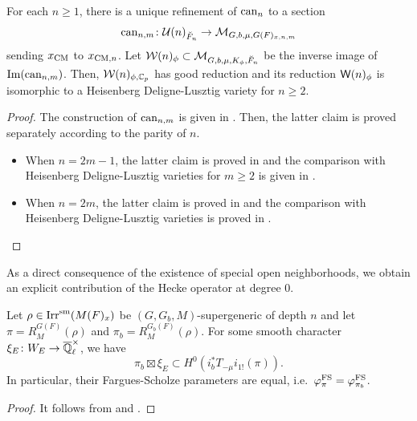 \documentclass[12pt,reqno]{amsart}
\begin{document}
\begin{thm} \label{thm:property_of_special_affinoids}
    For each $n \geq 1$, there is a unique refinement of ${\operatorname{can}}_n$ to a section
    \[
        {\operatorname{can}}_{n, m} \colon {\mathcal{U}}(n)_{\breve{F}_n} \to {\mathcal{M}}_{G, b, \mu, G(F)_{x, n, m}}
    \]
    sending $x_{\operatorname{CM}}$ to $x_{{\operatorname{CM}}, n}$. Let ${\mathcal{W}}(n)_\phi \subset {\mathcal{M}}_{G, b, \mu, K_\phi, \breve{F}_n}$ be the inverse image of ${\operatorname{Im}}({\operatorname{can}}_{n, m})$. Then, ${\mathcal{W}}(n)_{\phi, \mathbb{C}_p}$ has good reduction and its reduction ${\mathsf{W}}(n)_\phi$ is isomorphic to a Heisenberg Deligne-Lusztig variety for $n \geq 2$. 
\end{thm}
\begin{proof}
    The construction of ${\operatorname{can}}_{n, m}$ is given in . Then, the latter claim is proved separately according to the parity of $n$. 
    \begin{itemize}
        \item When $n = 2m - 1$, the latter claim is proved in  and the comparison with Heisenberg Deligne-Lusztig varieties for $m \geq 2$ is given in . 
        \item When $n = 2m$, the latter claim is proved in  and the comparison with Heisenberg Deligne-Lusztig varieties is proved in . 
    \end{itemize}
    \vspace{-\topsep}
\end{proof}

As a direct consequence of the existence of special open neighborhoods, we obtain an explicit contribution of the Hecke operator at degree $0$. 

\begin{cor} \label{cor:Hecke_operator_unramified_CM}
    Let $\rho \in {\operatorname{Irr}}^{\operatorname{sm}}(M(F)_x)$ be $(G, G_b, M)$-supergeneric of depth $n$ and let $\pi = R^{G(F)}_M(\rho)$ and $\pi_b =  R^{G_b(F)}_M(\rho)$. For some smooth character $\xi_E \colon W_E \to {\overline{\mathbb{Q}}_\ell^\times}$, we have 
    \[
        \pi_b \boxtimes \xi_E \subset H^0(i_b^* T_{-\mu} i_{1!}(\pi)). 
    \]
    In particular, their Fargues-Scholze parameters are equal, i.e.\ $\varphi^{\operatorname{FS}}_\pi = \varphi^{\operatorname{FS}}_{\pi_b}$. 
\end{cor}
\begin{proof}
    It follows from  and . 
\end{proof}
\end{document}
